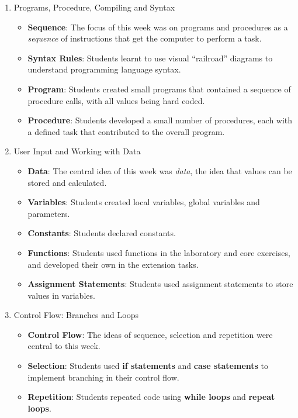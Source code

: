 \begin{enumerate}
  \item Programs, Procedure, Compiling and Syntax
  \begin{itemize}[noitemsep,nolistsep]
  	\item \textbf{Sequence}: The focus of this week was on programs and procedures as a \emph{sequence} of instructions that get the computer to perform a task.
  	\item \textbf{Syntax Rules}: Students learnt to use visual ``railroad'' diagrams \cite{Braz:1990} to understand programming language syntax.
  	\item \textbf{Program}: Students created small programs that contained a sequence of procedure calls, with all values being hard coded.
  	\item \textbf{Procedure}: Students developed a small number of procedures, each with a defined task that contributed to the overall program.
  \end{itemize}
  \item User Input and Working with Data
  \begin{itemize}[noitemsep,nolistsep]
  	\item \textbf{Data}: The central idea of this week was \emph{data}, the idea that values can be stored and calculated.
  	\item \textbf{Variables}: Students created local variables, global variables and parameters.
  	\item \textbf{Constants}: Students declared constants.
  	\item \textbf{Functions}: Students used functions in the laboratory and core exercises, and developed their own in the extension tasks.
  	\item \textbf{Assignment Statements}: Students used assignment statements to store values in variables. 
  \end{itemize}
  \item Control Flow: Branches and Loops
  \begin{itemize}[noitemsep,nolistsep]
  	\item \textbf{Control Flow}: The ideas of sequence, selection and repetition were central to this week.
  	\item \textbf{Selection}: Students used \textbf{if statements} and  \textbf{case statements} to implement branching in their control flow.
  	\item \textbf{Repetition}: Students repeated code using \textbf{while loops} and \textbf{repeat loops}.

\end{itemize}
\end{enumerate}
